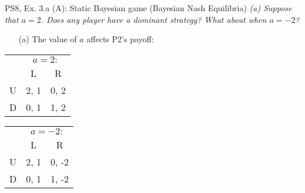 \begin{frame}{PS8, Ex. 3.a (A): Static Bayesian game (Bayesian Nash Equilibria)}
    \textit{(a) Suppose that $a = 2$. Does any player have a dominant strategy? What about when $a = -2$?}
    \vspace{-8pt}
    \begin{multicols}{2}
      \begin{itemize}
      \item[(a)] The value of $a$ affects P2's payoff:
      \end{itemize}
      \vfill\null\columnbreak
      \begin{table}
          \begin{tabular}{l|c|c|}
          \multicolumn{1}{c}{} & \multicolumn{2}{c}{$a=2:$} \\
          \multicolumn{1}{c}{} & \multicolumn{1}{c}{L} & \multicolumn{1}{c}{R} \\\cline{2-3}
          U & 2, 1 & 0, 2 \\\cline{2-3}
          D & 0, 1 & 1, 2 \\\cline{2-3}
        \end{tabular}
      \end{table}
      \vspace{-8pt}
      \begin{table}
        \begin{tabular}{l|c|c|}
          \multicolumn{1}{c}{} & \multicolumn{2}{c}{$a=-2:$} \\
          \multicolumn{1}{c}{} & \multicolumn{1}{c}{L} & \multicolumn{1}{c}{R} \\\cline{2-3}
          U & 2, 1 & 0, -2 \\\cline{2-3}
          D & 0, 1 & 1, -2 \\\cline{2-3}
        \end{tabular}
      \end{table}
      \vfill\null
    \end{multicols}
\end{frame}
